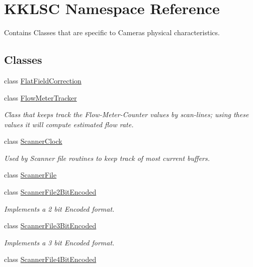 \hypertarget{namespace_k_k_l_s_c}{}\section{K\+K\+L\+SC Namespace Reference}
\label{namespace_k_k_l_s_c}


Contains Classes that are specific to Cameras physical characteristics.  


\subsection*{Classes}
\begin{DoxyCompactItemize}
\item 
class \hyperlink{class_k_k_l_s_c_1_1_flat_field_correction}{Flat\+Field\+Correction}
\item 
class \hyperlink{class_k_k_l_s_c_1_1_flow_meter_tracker}{Flow\+Meter\+Tracker}
\begin{DoxyCompactList}\small\item\em Class that keeps track the Flow-\/\+Meter-\/\+Counter values by scan-\/lines; using these values it will compute estimated flow rate. \end{DoxyCompactList}\item 
class \hyperlink{class_k_k_l_s_c_1_1_scanner_clock}{Scanner\+Clock}
\begin{DoxyCompactList}\small\item\em Used by Scanner file routines to keep track of most current buffers. \end{DoxyCompactList}\item 
class \hyperlink{class_k_k_l_s_c_1_1_scanner_file}{Scanner\+File}
\item 
class \hyperlink{class_k_k_l_s_c_1_1_scanner_file2_bit_encoded}{Scanner\+File2\+Bit\+Encoded}
\begin{DoxyCompactList}\small\item\em Implements a 2 bit Encoded format. \end{DoxyCompactList}\item 
class \hyperlink{class_k_k_l_s_c_1_1_scanner_file3_bit_encoded}{Scanner\+File3\+Bit\+Encoded}
\begin{DoxyCompactList}\small\item\em Implements a 3 bit Encoded format. \end{DoxyCompactList}\item 
class \hyperlink{class_k_k_l_s_c_1_1_scanner_file4_bit_encoded}{Scanner\+File4\+Bit\+Encoded}

\end{DoxyCompactItemize}
